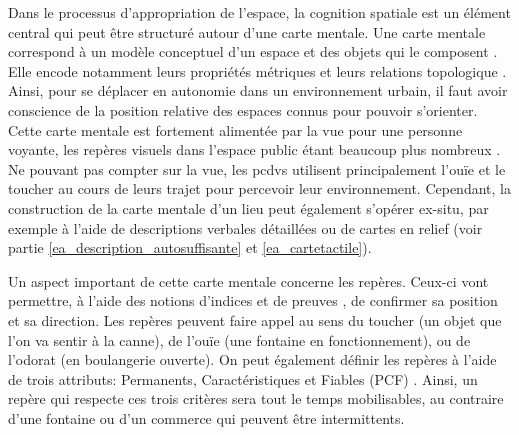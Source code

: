 

\newpar{}

Dans le processus d'appropriation de l'espace, la cognition spatiale est un élément central qui peut être structuré autour d'une carte mentale. Une carte mentale correspond à un modèle conceptuel d'un espace et des objets qui le composent \citep{Jacobson1998}. Elle encode notamment leurs propriétés métriques et leurs relations topologique \citep{Denis1992}. Ainsi, pour se déplacer en autonomie dans un environnement urbain, il faut avoir conscience de la position relative des espaces connus pour pouvoir s'orienter. Cette carte mentale est fortement alimentée par la vue pour une personne voyante, les repères visuels dans l'espace public étant beaucoup plus nombreux \citep{thinus1997}. Ne pouvant pas compter sur la vue, les \glspl{pcdv} utilisent principalement l'ouïe et le toucher au cours de leurs trajet pour percevoir leur environnement. Cependant, la construction de la carte mentale d'un lieu peut également s'opérer ex-situ, par exemple à l'aide de descriptions verbales détaillées ou de cartes en relief (voir partie \ref{ea_description_autosuffisante} et \ref{ea_cartetactile}).

\newpar{}

Un aspect important de cette carte mentale concerne les repères. Ceux-ci vont permettre, à l'aide des notions d'indices et de preuves \citep{Giudice2010}, de confirmer sa position et sa direction. Les repères peuvent faire appel au sens du toucher (un objet que l'on va sentir à la canne), de l'ouïe (une fontaine en fonctionnement), ou de l'odorat (en boulangerie ouverte). On peut également définir les repères à l'aide de trois attributs: Permanents, Caractéristiques et Fiables (PCF) \citep{Denis2023}. Ainsi, un repère qui respecte ces trois critères sera tout le temps mobilisables, au contraire d'une fontaine ou d'un commerce qui peuvent être intermittents. 



